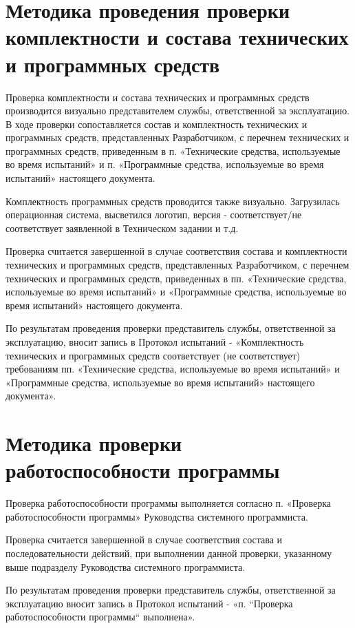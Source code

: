 \documentclass[14pt,a4paper,final]{extreport}
\begin{document}
\section{Методика проведения проверки комплектности и состава технических и программных средств}
Проверка комплектности и состава технических и программных средств производится визуально представителем службы, ответственной за эксплуатацию. В ходе проверки сопоставляется состав и комплектность технических и программных средств, представленных Разработчиком, с перечнем технических и программных средств, приведенным в п. «Технические средства, используемые во время испытаний» и п. «Программные средства, используемые во
время испытаний» настоящего документа.

Комплектность программных средств проводится также визуально. Загрузилась операционная система, высветился логотип, версия - соответствует/не соответствует заявленной в Техническом задании и т.д.

Проверка считается завершенной в случае соответствия состава и комплектности технических и программных средств, представленных Разработчиком, с перечнем технических и программных средств, приведенных в пп. «Технические средства, используемые во время испытаний» и «Программные средства, используемые во время испытаний» настоящего документа.

По результатам проведения проверки представитель службы, ответственной за
эксплуатацию, вносит запись в Протокол испытаний - «Комплектность технических и
программных средств соответствует (не соответствует) требованиям пп. «Технические средства,
используемые во время испытаний» и «Программные средства, используемые во время
испытаний» настоящего документа».

\section{Методика проверки работоспособности программы}
Проверка работоспособности программы выполняется согласно п. «Проверка работоспособности программы» Руководства системного программиста.

Проверка считается завершенной в случае соответствия состава и последовательности действий, при выполнении данной проверки, указанному выше подразделу Руководства системного программиста.

По результатам проведения проверки представитель службы, ответственной за эксплуатацию вносит запись в Протокол испытаний - «п. “Проверка работоспособности программы“ выполнена».
\end{document}
